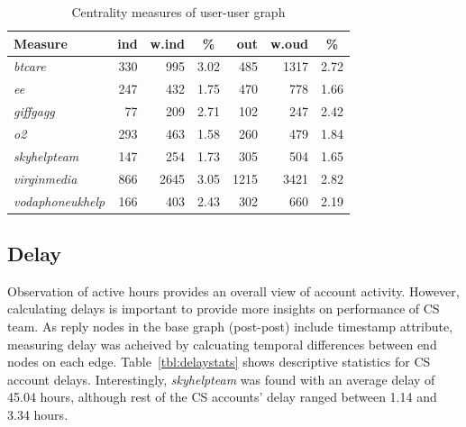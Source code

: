 \documentclass[sigconf]{acmart}
\begin{document}
\begin{table}[!h]
\centering
\begin{tabularx}{\columnwidth}{l|rrc|rrc}
\toprule
\textbf{Measure} & \textbf{ind} & \textbf{w.ind} & \textbf{\%} & \textbf{out} & \textbf{w.oud} & \textbf{\%}\\ 
\midrule
{\emph{btcare}} & 330 & 995 & 3.02 & 485 & 1317 & 2.72\\
{\emph{ee}} & 247 & 432 & 1.75 & 470 & 778 & 1.66 \\
{\emph{giffgagg}} & 77 & 209 & 2.71 & 102 & 247 & 2.42 \\ 
{\emph{o2}} & 293 & 463 & 1.58 & 260 & 479 & 1.84 \\
{\emph{skyhelpteam}} & 147 & 254 & 1.73 & 305 & 504 & 1.65\\
{\emph{virginmedia}} & 866 & 2645 & 3.05 & 1215 & 3421 & 2.82\\
{\emph{vodaphoneukhelp}} & 166 & 403 & 2.43 & 302 & 660 & 2.19\\
\bottomrule
\end{tabularx}
\caption{Centrality measures of user-user graph}
\label{tbl:uucentralitymeasures}
\end{table}

\subsection{Delay}

Observation of active hours provides an overall view of
account activity. However, calculating delays is important to provide
more insights on performance of CS team. As reply nodes in the base graph (post-post)
include timestamp attribute, measuring delay was acheived by calcuating temporal
differences between end nodes on each edge. Table~\ref{tbl:delaystats} 
shows descriptive statistics for CS account delays. Interestingly, 
{\emph{skyhelpteam}} was found with an average delay of 45.04 hours,
although rest of the CS accounts' delay ranged between 1.14 and 3.34 hours. 

\end{document}
